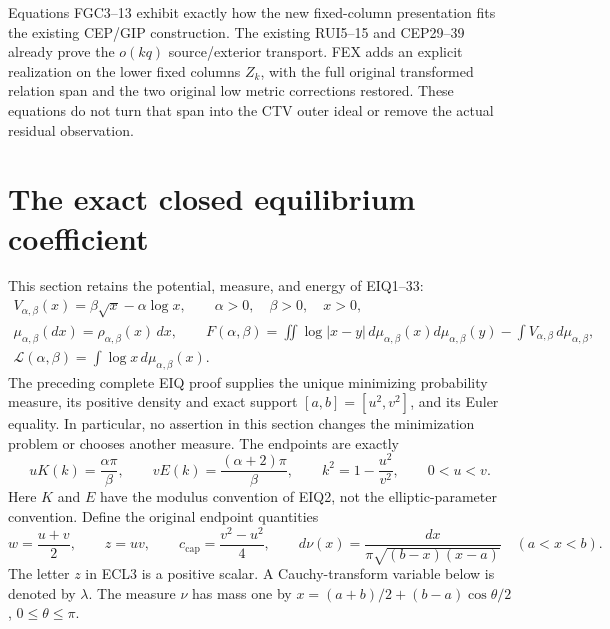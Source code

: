 \documentclass[11pt,a4paper]{article}
\begin{document}
Equations FGC3--13 exhibit exactly how the new fixed-column presentation
fits the existing CEP/GIP construction. The existing RUI5--15 and
CEP29--39 already prove the $o(kq)$ source/exterior transport. FEX adds
an explicit realization on the lower fixed columns $Z_k$, with the
full original transformed relation span and the two original low
metric corrections restored. These equations do not turn that span
into the CTV outer ideal or remove the actual residual observation.


\clearpage
\section{The exact closed equilibrium coefficient}
\label{sec:closed-equilibrium-intake}

This section retains the potential, measure, and energy of EIQ1--33:
\begin{equation}\tag{ECL1}
\begin{gathered}
V_{\alpha,\beta}(x)=\beta\sqrt{x}-\alpha\log x,\qquad
\alpha>0,\quad\beta>0,\quad x>0,\\
\mu_{\alpha,\beta}(dx)=\rho_{\alpha,\beta}(x)\,dx,\qquad
F(\alpha,\beta)=
\iint\log|x-y|\,d\mu_{\alpha,\beta}(x)d\mu_{\alpha,\beta}(y)
-\int V_{\alpha,\beta}\,d\mu_{\alpha,\beta},\\
\mathcal L(\alpha,\beta)=\int\log x\,d\mu_{\alpha,\beta}(x).
\end{gathered}
\end{equation}
The preceding complete EIQ proof supplies the unique minimizing
probability measure, its positive density and exact support
$[a,b]=[u^2,v^2]$, and its Euler equality. In particular, no assertion
in this section changes the minimization problem or chooses another
measure. The endpoints are exactly
\begin{equation}\tag{ECL2}
uK(k)=\frac{\alpha\pi}{\beta},\qquad
vE(k)=\frac{(\alpha+2)\pi}{\beta},\qquad
k^2=1-\frac{u^2}{v^2},\qquad 0<u<v.
\end{equation}
Here $K$ and $E$ have the modulus convention of EIQ2, not the
elliptic-parameter convention. Define the original endpoint quantities
\begin{equation}\tag{ECL3}
w=\frac{u+v}{2},\qquad z=uv,\qquad
c_{\mathrm{cap}}=\frac{v^2-u^2}{4},\qquad
d\nu(x)=\frac{dx}{\pi\sqrt{(b-x)(x-a)}}\quad(a<x<b).
\end{equation}
The letter $z$ in ECL3 is a positive scalar. A Cauchy-transform variable
below is denoted by $\lambda$. The measure $\nu$ has mass one by
$x=(a+b)/2+(b-a)\cos\theta/2$, $0\leq\theta\leq\pi$.
\end{document}

